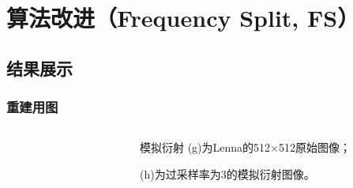 \documentclass[12pt,aspectratio=169]{beamer} %
\begin{document}
\section{算法改进（Frequency Split, FS）}

\subsection{结果展示}

\begin{frame}
    \frametitle{重建用图}
    \begin{columns}
        \begin{column}{0.7\textwidth}
            \begin{figure}
                \qquad
            \end{figure}
        \end{column}
        \begin{column}{0.3\textwidth}
            \begin{block}{模拟衍射}
                (g)为Lenna的512$\times$512原始图像；

                (h)为过采样率为3的模拟衍射图像。
            \end{block}
        \end{column}
    \end{columns}
\end{frame}
\end{document}
